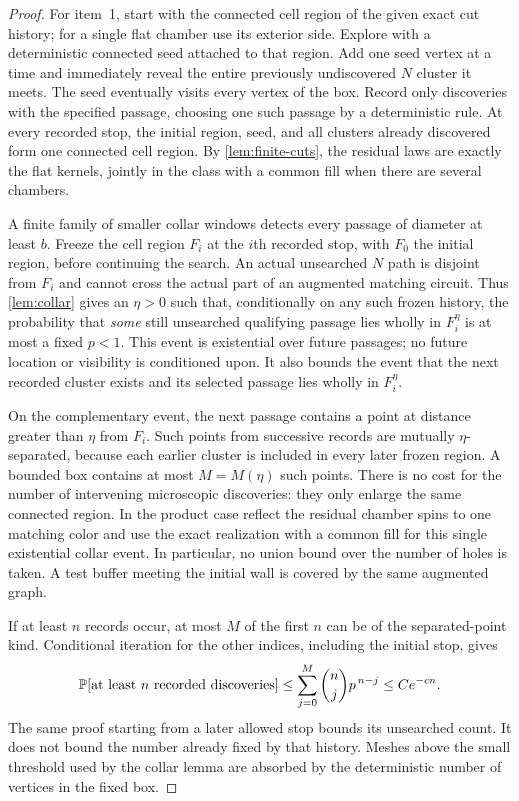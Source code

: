 \begin{proof}
For item~1, start with the connected cell region of the given
exact cut history; for a single flat chamber use its exterior side.
Explore with a deterministic connected seed attached to that region.
Add one seed vertex at a time and immediately reveal the entire
previously undiscovered $N$ cluster it meets. The seed eventually
visits every vertex of the box. Record only discoveries with the
specified passage, choosing one such passage by a deterministic rule.
At every recorded stop, the initial region, seed, and all clusters
already discovered form one connected cell region. By
\cref{lem:finite-cuts}, the residual laws are exactly the flat
kernels, jointly in the class with a common fill when there are several
chambers.

A finite family of smaller collar windows detects every passage
of diameter at least $b$. Freeze the cell region $F_i$ at the
$i$th recorded stop, with $F_0$ the initial region, before continuing
the search. An actual unsearched $N$ path is disjoint from $F_i$ and
cannot cross the actual part of an augmented matching circuit.
Thus \cref{lem:collar} gives an $\eta>0$ such that, conditionally on
any such frozen history, the probability that \emph{some} still
unsearched qualifying passage lies wholly in $F_i^\eta$ is at most
a fixed $p<1$. This event is existential over future passages; no
future location or visibility is conditioned upon. It also bounds
the event that the next recorded cluster exists and its selected
passage lies wholly in $F_i^\eta$.

On the complementary event, the next passage contains a point at
distance greater than $\eta$ from $F_i$. Such points from successive
records are mutually $\eta$-separated, because each earlier cluster
is included in every later frozen region. A bounded box contains
at most $M=M(\eta)$ such points. There is no cost for the number
of intervening microscopic discoveries: they only enlarge the same
connected region. In the product case reflect the residual chamber
spins to one matching color and use the exact realization with a common fill
for this single existential collar event. In particular, no union
bound over the number of holes is taken. A test buffer meeting the
initial wall is covered by the same augmented graph.

If at least $n$ records occur, at most $M$ of the first $n$ can be
of the separated-point kind. Conditional iteration for the other
indices, including the initial stop, gives
\begin{equation}\label{eq:spatial-count-tail}
 \P[\text{at least }n\text{ recorded discoveries}]
       \le \sum_{j=0}^{M}\binom{n}{j}p^{\,n-j}
       \le C e^{-c n}.
\end{equation}
The same proof starting from a later allowed stop bounds its
unsearched count. It does not bound the number already fixed
by that history. Meshes above the small threshold used by the collar
lemma are absorbed by the deterministic number of vertices in the
fixed box.


\end{proof}
